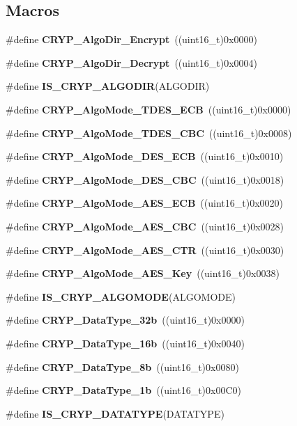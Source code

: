 \subsection*{Macros}
\begin{DoxyCompactItemize}
\item 
\#define \textbf{ C\+R\+Y\+P\+\_\+\+Algo\+Dir\+\_\+\+Encrypt}~((uint16\+\_\+t)0x0000)
\item 
\#define \textbf{ C\+R\+Y\+P\+\_\+\+Algo\+Dir\+\_\+\+Decrypt}~((uint16\+\_\+t)0x0004)
\item 
\#define \textbf{ I\+S\+\_\+\+C\+R\+Y\+P\+\_\+\+A\+L\+G\+O\+D\+IR}(A\+L\+G\+O\+D\+IR)
\item 
\#define \textbf{ C\+R\+Y\+P\+\_\+\+Algo\+Mode\+\_\+\+T\+D\+E\+S\+\_\+\+E\+CB}~((uint16\+\_\+t)0x0000)
\item 
\#define \textbf{ C\+R\+Y\+P\+\_\+\+Algo\+Mode\+\_\+\+T\+D\+E\+S\+\_\+\+C\+BC}~((uint16\+\_\+t)0x0008)
\item 
\#define \textbf{ C\+R\+Y\+P\+\_\+\+Algo\+Mode\+\_\+\+D\+E\+S\+\_\+\+E\+CB}~((uint16\+\_\+t)0x0010)
\item 
\#define \textbf{ C\+R\+Y\+P\+\_\+\+Algo\+Mode\+\_\+\+D\+E\+S\+\_\+\+C\+BC}~((uint16\+\_\+t)0x0018)
\item 
\#define \textbf{ C\+R\+Y\+P\+\_\+\+Algo\+Mode\+\_\+\+A\+E\+S\+\_\+\+E\+CB}~((uint16\+\_\+t)0x0020)
\item 
\#define \textbf{ C\+R\+Y\+P\+\_\+\+Algo\+Mode\+\_\+\+A\+E\+S\+\_\+\+C\+BC}~((uint16\+\_\+t)0x0028)
\item 
\#define \textbf{ C\+R\+Y\+P\+\_\+\+Algo\+Mode\+\_\+\+A\+E\+S\+\_\+\+C\+TR}~((uint16\+\_\+t)0x0030)
\item 
\#define \textbf{ C\+R\+Y\+P\+\_\+\+Algo\+Mode\+\_\+\+A\+E\+S\+\_\+\+Key}~((uint16\+\_\+t)0x0038)
\item 
\#define \textbf{ I\+S\+\_\+\+C\+R\+Y\+P\+\_\+\+A\+L\+G\+O\+M\+O\+DE}(A\+L\+G\+O\+M\+O\+DE)
\item 
\#define \textbf{ C\+R\+Y\+P\+\_\+\+Data\+Type\+\_\+32b}~((uint16\+\_\+t)0x0000)
\item 
\#define \textbf{ C\+R\+Y\+P\+\_\+\+Data\+Type\+\_\+16b}~((uint16\+\_\+t)0x0040)
\item 
\#define \textbf{ C\+R\+Y\+P\+\_\+\+Data\+Type\+\_\+8b}~((uint16\+\_\+t)0x0080)
\item 
\#define \textbf{ C\+R\+Y\+P\+\_\+\+Data\+Type\+\_\+1b}~((uint16\+\_\+t)0x00\+C0)
\item 
\#define \textbf{ I\+S\+\_\+\+C\+R\+Y\+P\+\_\+\+D\+A\+T\+A\+T\+Y\+PE}(D\+A\+T\+A\+T\+Y\+PE)

\end{DoxyCompactItemize}
